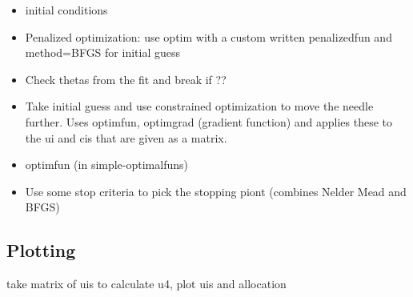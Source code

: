 \documentclass[12pt, oneside]{article}   	%
\begin{document}
\begin{itemize}
\item initial conditions

\item Penalized optimization: use optim with a custom written penalizedfun and method=BFGS for initial guess

\item Check thetas from the fit and break if ??

\item Take initial guess and use constrained optimization to move the needle further. Uses optimfun, optimgrad (gradient function) and applies these to the ui and cis that are given as a matrix.

\item optimfun (in simple-optimalfuns)

\item Use some stop criteria to pick the stopping piont (combines Nelder Mead and BFGS)
\end{itemize}

\subsection*{Plotting}
take matrix of uis to calculate u4, plot uis and allocation
\fi
\end{document}
